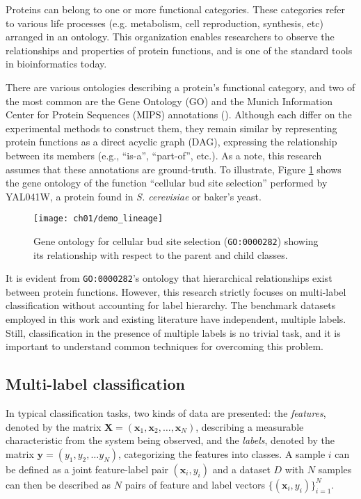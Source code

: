 \par Proteins can belong to one or more functional categories. These
categories refer to various life processes (e.g. metabolism, cell
reproduction, synthesis, etc) arranged in an ontology. This
organization enables researchers to observe the relationships and 
properties of protein functions, and is one of the standard tools
in bioinformatics today.

\par There are various ontologies describing a protein's functional category,
and two of the most common are the Gene Ontology (GO) and the Munich
Information Center for Protein Sequences (MIPS) annotations
(\cite{gaudet2017gene, mewes2006mips}). Although each differ on the
experimental methods to construct them, they remain similar by representing
protein functions as a direct acyclic graph (DAG), expressing the relationship
between its members (e.g., ``is-a'', ``part-of'', etc.). As a note, this
research assumes that these annotations are ground-truth. To illustrate,
Figure \ref{demo:yeast_go} shows the gene ontology of the  function ``cellular
bud site selection'' performed by YAL041W, a protein found in
\textit{S. cerevisiae} or baker's yeast.

\begin{figure}[!t]
  \centering
  \texttt{[image: ch01/demo\_lineage]}
  \caption[Gene ontology for \texttt{GO:0000282} or "cellular bud site selection"]{
      Gene ontology for cellular bud site selection (\texttt{GO:0000282})
      showing its relationship with respect to the parent and child classes.
  }
  \label{demo:yeast_go}
\end{figure}

\par It is evident from \texttt{GO:0000282}'s ontology that hierarchical
relationships exist between protein functions. However, this research strictly
focuses on multi-label classification without accounting for label
hierarchy. The benchmark datasets employed in this work and existing literature
have independent, multiple labels. Still, classification in the presence
of multiple labels is no trivial task, and it is important to understand common 
techniques for overcoming this problem.

\subsection{Multi-label classification}

\par In typical classification tasks, two kinds of data are presented:
the \textit{features}, denoted by the matrix $\mathbf{X} =
(\mathbf{x}_{1}, \mathbf{x}_{2}, \dots, \mathbf{x}_{N})$, describing
a measurable characteristic from the system being observed, and the
\textit{labels}, denoted by the matrix $\mathbf{y} = (y_{1}, y_{2}, \dots
y_{N})$, categorizing the features into classes. A sample $i$
can be defined as a joint feature-label pair $(\mathbf{x}_{i}, y_{i})$ and a
dataset $D$ with $N$ samples can then be described as $N$ pairs of feature
and label vectors  $\{(\mathbf{x}_{i}, y_{i})\}_{i=1}^{N}$.

